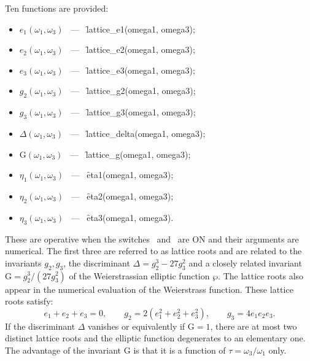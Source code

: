 Ten functions are provided:
\begin{itemize}
\item $e_1(\omega_1, \omega_3)$ \ --- \ \f{lattice\_e1(omega1, omega3)};
\item $e_2(\omega_1, \omega_3)$ \ --- \ \f{lattice\_e2(omega1, omega3)};
\item $e_3(\omega_1, \omega_3)$ \ --- \ \f{lattice\_e3(omega1, omega3)};
\item $g_2(\omega_1, \omega_3)$ \ --- \ \f{lattice\_g2(omega1, omega3)};
\item $g_3(\omega_1, \omega_3)$ \ --- \ \f{lattice\_g3(omega1, omega3)};
\item $\Delta(\omega_1, \omega_3)$ \ --- \ \f{lattice\_delta(omega1, omega3)};
\item $\mathrm{G}(\omega_1, \omega_3)$ \ --- \ \f{lattice\_g(omega1, omega3)};
\item $\eta_1(\omega_1, \omega_3)$ \ --- \ \f{eta1(omega1, omega3)};
\item $\eta_2(\omega_1, \omega_3)$ \ --- \ \f{eta2(omega1, omega3)};
\item $\eta_3(\omega_1, \omega_3)$ \ --- \ \f{eta3(omega1, omega3)}.
\end{itemize}

These are operative when the switches \ and \ are ON
and their arguments are numerical. The first three are referred to as lattice
roots and are related to the invariants
$g_2, g_3$, the discriminant $\Delta = g_2^3-27g_3^2$ and a closely related
invariant $\mathrm{G} = g_2^3/(27 g_3^2)$ of the Weierstrassian
elliptic function $\wp$. The lattice roots also appear in the numerical
evaluation of the Weierstrass function. These lattice roots satisfy:
\[e_1+e_2+e_3=0,\qquad g_2=2(e_1^2+e_2^2+e_3^2),\qquad g_3= 4e_1e_2e_3.\]
If the discriminant $\Delta$ vanishes or equivalently if $\mathrm{G} = 1$,
there are at most two distinct lattice roots and the elliptic function
degenerates to an elementary one. The advantage of the invariant
$\mathrm{G}$ is that it is a function of $\tau = \omega_3/\omega_1$ only.

